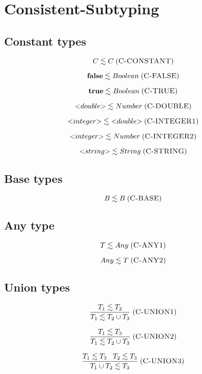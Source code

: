 \documentclass[12pt]{article}
\newcommand{\mylabel}[1]{\; (\textsc{#1})}
\newcommand{\subtype}{<:}
\begin{document}
\section{Consistent-Subtyping}

\subsection{Constant types}

\[
C \lesssim C
\mylabel{C-CONSTANT}
\]

\[
\mathbf{false} \lesssim Boolean
\mylabel{C-FALSE}
\]

\[
\mathbf{true} \lesssim Boolean
\mylabel{C-TRUE}
\]

\[
{<}double{>} \lesssim Number
\mylabel{C-DOUBLE}
\]

\[
{<}integer{>} \lesssim {<}double{>}
\mylabel{C-INTEGER1}
\]

\[
{<}integer{>} \lesssim Number
\mylabel{C-INTEGER2}
\]

\[
{<}string{>} \lesssim String
\mylabel{C-STRING}
\]

\subsection{Base types}

\[
B \lesssim B
\mylabel{C-BASE}
\]

%

\subsection{Any type}

\[
T \lesssim Any
\mylabel{C-ANY1}
\]

\[
Any \lesssim T
\mylabel{C-ANY2}
\]

\subsection{Union types}

\[
\frac{T_{1} \lesssim T_{2}}
     {T_{1} \lesssim T_{2} \cup T_{3}}
\mylabel{C-UNION1}
\]

\[
\frac{T_{1} \lesssim T_{3}}
     {T_{1} \lesssim T_{2} \cup T_{3}}
\mylabel{C-UNION2}
\]

\[
\frac{T_{1} \lesssim T_{3} \;\;\; T_{2} \lesssim T_{3}}
     {T_{1} \cup T_{2} \lesssim T_{3}}
\mylabel{C-UNION3}
\]
\end{document}

